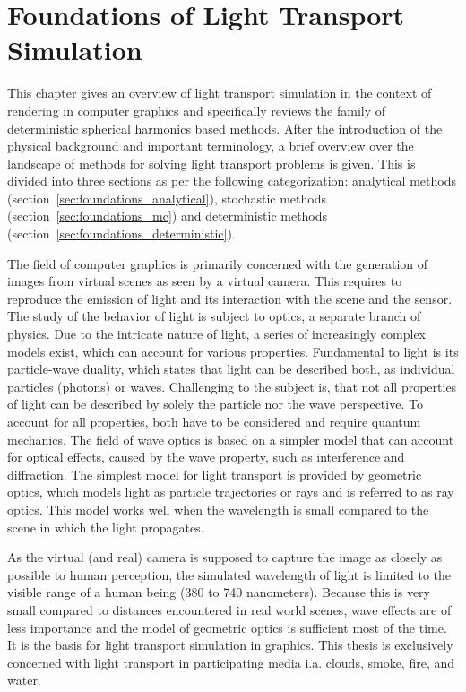 \chapter{Foundations of Light Transport Simulation}
\label{sec:foundations}

This chapter gives an overview of light transport simulation in the context of rendering in computer graphics and specifically reviews the family of deterministic spherical harmonics based methods. After the introduction of the physical background and important terminology, a brief overview over the landscape of methods for solving light transport problems is given. This is divided into three sections as per the following categorization: analytical methods (section~\ref{sec:foundations_analytical}), stochastic methods (section~\ref{sec:foundations_mc}) and deterministic methods (section~\ref{sec:foundations_deterministic}).

The field of computer graphics is primarily concerned with the generation of images from virtual scenes as seen by a virtual camera. This requires to reproduce the emission of light and its interaction with the scene and the sensor. The study of the behavior of light is subject to optics, a separate branch of physics. Due to the intricate nature of light, a series of increasingly complex models exist, which can account for various properties. Fundamental to light is its particle-wave duality, which states that light can be described both, as individual particles (photons) or waves. Challenging to the subject is, that not all properties of light can be described by solely the particle nor the wave perspective. To account for all properties, both have to be considered and require quantum mechanics. The field of wave optics is based on a simpler model that can account for optical effects, caused by the wave property, such as interference and diffraction. The simplest model for light transport is provided by geometric optics, which models light as particle trajectories or rays and is referred to as ray optics. This model works well when the wavelength is small compared to the scene in which the light propagates. 

As the virtual (and real) camera is supposed to capture the image as closely as possible to human perception, the simulated wavelength of light is limited to the visible range of a human being (380 to 740 nanometers). Because this is very small compared to distances encountered in real world scenes, wave effects are of less importance and the model of geometric optics is sufficient most of the time. It is the basis for light transport simulation in graphics. This thesis is exclusively concerned with light transport in participating media i.a. clouds, smoke, fire, and water.


